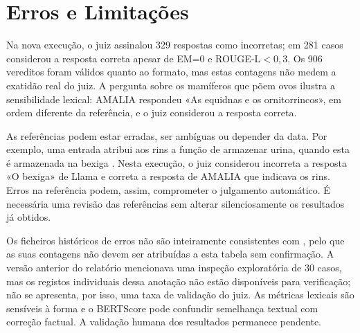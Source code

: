 \section{Erros e Limitações}

Na nova execução, o juiz assinalou 329 respostas como incorretas; em 281 casos considerou a resposta correta apesar de EM=0 e ROUGE-L$<0,3$. Os 906 vereditos foram válidos quanto ao formato, mas estas contagens não medem a exatidão real do juiz. A pergunta sobre os mamíferos que põem ovos ilustra a sensibilidade lexical: AMALIA respondeu «As equidnas e os ornitorrincos», em ordem diferente da referência, e o juiz considerou a resposta correta.

As referências podem estar erradas, ser ambíguas ou depender da data. Por exemplo, uma entrada atribui aos rins a função de armazenar urina, quando esta é armazenada na bexiga \cite{nhs_bexiga}. Nesta execução, o juiz considerou incorreta a resposta «O bexiga» de Llama e correta a resposta de AMALIA que indicava os rins. Erros na referência podem, assim, comprometer o julgamento automático. É necessária uma revisão das referências sem alterar silenciosamente os resultados já obtidos.

Os ficheiros históricos de erros não são inteiramente consistentes com , pelo que as suas contagens não devem ser atribuídas a esta tabela sem confirmação. A versão anterior do relatório mencionava uma inspeção exploratória de 30 casos, mas os registos individuais dessa anotação não estão disponíveis para verificação; não se apresenta, por isso, uma taxa de validação do juiz. As métricas lexicais são sensíveis à forma e o BERTScore pode confundir semelhança textual com correção factual. A validação humana dos resultados permanece pendente.
